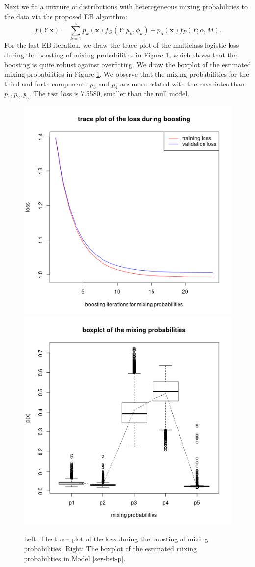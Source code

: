 \documentclass[11pt]{article}
\numberwithin{equation}{section}
\def\bx{\boldsymbol{x}}
\begin{document}
Next we fit a mixture of distributions with heterogeneous mixing probabilities to the data via the proposed EB algorithm:
\begin{equation}\label{sev-bst-p}
f(Y|\bx)=\sum_{k=1}^4p_k(\bx)f_{G}(Y;\mu_k,\phi_k)+p_5(\bx)f_{P}(Y;\alpha,M).
\end{equation}
For the last EB iteration, we draw the trace plot of the multiclass logistic loss during the boosting of mixing probabilities in Figure \ref{bx-bst-p}, which shows that the boosting is quite robust against overfitting.
We draw the boxplot of the estimated mixing probabilities in Figure \ref{bx-bst-p}.
We observe that the mixing probabilities for the third and forth components $p_3$ and $p_4$ are more related with the covariates than $p_1,p_2,p_5$.
The test loss is  7.5580, smaller than the null model.
	\begin{figure}[htp!]
		\centering
				\includegraphics[width=0.4\linewidth]{../plots/sev/bst_p_trace}
		\includegraphics[width=0.4\linewidth]{../plots/sev/bst_p}
		\caption{Left: The trace plot of the loss during the boosting of mixing probabilities. Right: The boxplot of the estimated mixing probabilities in Model \eqref{sev-bst-p}.}\label{bx-bst-p}
	\end{figure}
\end{document}
